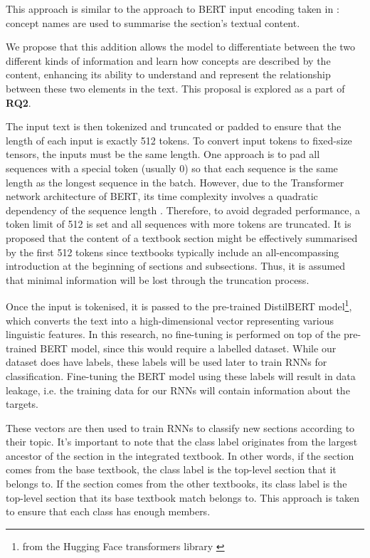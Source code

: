\documentclass[twocolumn]{article}
\begin{document}
This approach is similar to the approach to BERT input encoding taken in \textcite{alpizarchacon2023a}: concept names are used to summarise the section's textual content.

We propose that this addition allows the model to differentiate between the two different kinds of information and learn how concepts are described by the content, enhancing its ability to understand and represent the relationship between these two elements in the text. This proposal is explored as a part of \textbf{RQ2}.

The input text is then tokenized and truncated or padded to ensure that the length of each input is exactly 512 tokens. To convert input tokens to fixed-size tensors, the inputs must be the same length. One approach is to pad all sequences with a special token (usually $0$) so that each sequence is the same length as the longest sequence in the batch. However, due to the Transformer network architecture of BERT, its time complexity involves a quadratic dependency of the sequence length \cite{vaswani2017}. Therefore, to avoid degraded performance, a token limit of 512 is set and all sequences with more tokens are truncated. It is proposed that the content of a textbook section might be effectively summarised by the first 512 tokens since textbooks typically include an all-encompassing introduction at the beginning of sections and subsections. Thus, it is assumed that minimal information will be lost through the truncation process.

Once the input is tokenised, it is passed to the pre-trained DistilBERT model\footnote{from the Hugging Face transformers library \cite{huggingface}}, which converts the text into a high-dimensional vector representing various linguistic features. In this research, no fine-tuning is performed on top of the pre-trained BERT model, since this would require a labelled dataset. While our dataset does have labels, these labels will be used later to train RNNs for classification. Fine-tuning the BERT model using these labels will result in data leakage, i.e. the training data for our RNNs will contain information about the targets.

These vectors are then used to train RNNs to classify new sections according to their topic. It’s important to note that the class label originates from the largest ancestor of the section in the integrated textbook. In other words, if the section comes from the base textbook, the class label is the top-level section that it belongs to. If the section comes from the other textbooks, its class label is the top-level section that its base textbook match belongs to. This approach is taken to ensure that each class has enough members.
\end{document}
